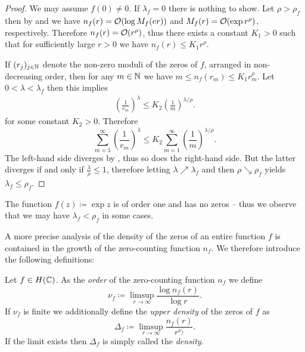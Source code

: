 \begin{proof}
    We may assume $f(0) \neq 0$. If $\lambda_f = 0$ there is nothing to show. Let $\rho > \rho_f$ then
    by  and  we have $n_f(r) = \mathcal{O}(\log M_f(er))$ and $M_f(r) = \mathcal{O}(\exp r^\rho)$, respectively. Therefore $n_f(r) = \mathcal{O}(r^\rho)$, thus there exists a constant $K_1 > 0$ such that for sufficiently large $r > 0$ we have $n_f(r) \leq K_1 r^\rho$.
    
    If $(r_j)_{j \in \mathbb{N}}$ denote the non-zero moduli of the zeros of $f$, arranged in non-decreasing order, then for any $m \in \mathbb{N}$ we have $m \leq n_f(r_m) \leq K_1 r_m^{\rho}$. Let $0 < \lambda < \lambda_f$ then this implies
    \begin{align*}
        \left( \frac{1}{r_m} \right)^{\lambda} \leq K_2 \left( \frac{1}{m} \right)^{\lambda/\rho}.
    \end{align*}
    for some constant $K_2 > 0$. Therefore
    \begin{equation*}
        \sum_{m=1}^\infty \left( \frac{1}{r_m} \right)^{\lambda} \leq K_2 \sum_{m=1}^\infty \left( \frac{1}{m} \right)^{\lambda/\rho}.
    \end{equation*}
    The left-hand side diverges by , thus so does the right-hand side. But the latter diverges if and only if $\frac{\lambda}{\rho} \leq 1$, therefore letting $\lambda \nearrow \lambda_f$ and then $\rho \searrow \rho_f$ yields $\lambda_f \leq \rho_f$.
\end{proof}

\begin{remark}
    The function $f(z) \coloneqq \exp z$ is of order one and has no zeros -- thus we observe that we may have $\lambda_f < \rho_f$ in some cases.
\end{remark}

A more precise analysis of the density of the zeros of an entire function $f$ is contained in the growth of the zero-counting function $n_f$. We therefore introduce the following definitions:

\begin{definition} \label{def:order-density-zero-counting}
    Let $f \in H(\mathbb{C})$. As the \emph{order} of the zero-counting function $n_f$ we define
    \begin{equation}
        \nu_f \coloneqq \limsup_{r \to \infty} \frac{\log n_f(r)}{\log r}.
    \end{equation}
    If $\nu_f$ is finite we additionally define the \emph{upper density} of the zeros of $f$ as
    \begin{equation}
        \Delta_f \coloneqq \limsup_{r \to \infty} \frac{n_f(r)}{r^{\nu_f}}.
    \end{equation}
    If the limit exists then $\Delta_f$ is simply called the \emph{density}.
\end{definition}


